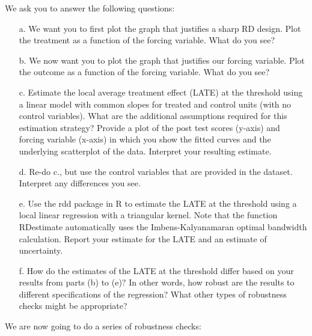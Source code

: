 \documentclass[]{tufte-handout}
\begin{document}
We ask you to answer the following questions:

\begin{enumerate}

\item[a.] We want you to first plot the graph that justifies a sharp RD design. Plot the treatment as a function of the forcing variable. What do you see?

\item[b.] We now want you to plot the graph that justifies our forcing variable. Plot the outcome as a function of the forcing variable. What do you see?

\item[c.]  Estimate the local average treatment effect (LATE) at the threshold using a linear model with common slopes for treated and control units (with no control variables). What are the additional assumptions required for this estimation strategy? Provide a plot of the post test scores (y-axis) and forcing variable (x-axis) in which you show the fitted curves and the underlying scatterplot of the data. Interpret your resulting estimate.

\item[d. ] Re-do c., but use the control variables that are provided in the dataset. Interpret any differences you see. 

\item[e. ] Use the rdd package in R to estimate the LATE at the threshold using a local linear regression with a triangular kernel. Note that the function RDestimate automatically uses the Imbens-Kalyanamaran optimal bandwidth calculation. Report your estimate for the LATE and an estimate of uncertainty.

\item[f. ] How do the estimates of the LATE at the threshold differ based on your results from parts (b) to (e)? In other words, how robust are the results to different specifications of the regression? What other types of robustness checks might be appropriate?
\end{enumerate}

We are now going to do a series of robustness checks:
\end{document}
